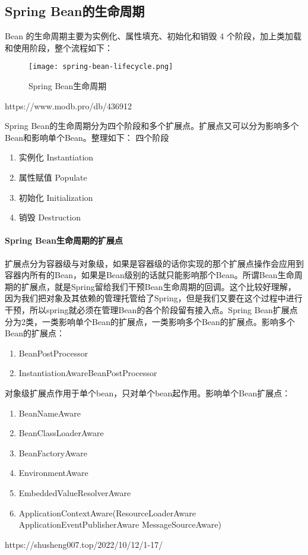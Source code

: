 \documentclass[../../../interview-questions.tex]{subfiles}
\begin{document}
\subsection{Spring Bean的生命周期}


Bean 的生命周期主要为实例化、属性填充、初始化和销毁 4 个阶段，加上类加载和使用阶段，整个流程如下：

\begin{figure}[htbp]
	\centering
	\texttt{[image: spring-bean-lifecycle.png]}
	\caption{Spring Bean生命周期}
	\label{fig:spring-bean-lifecycle}
\end{figure}

https://www.modb.pro/db/436912

Spring Bean的生命周期分为四个阶段和多个扩展点。扩展点又可以分为影响多个Bean和影响单个Bean。整理如下：
四个阶段

\begin{enumerate}
    \item {实例化 Instantiation}
    \item {属性赋值 Populate}
    \item {初始化 Initialization}
    \item {销毁 Destruction}
\end{enumerate}

\paragraph{Spring Bean生命周期的扩展点}

扩展点分为容器级与对象级，如果是容器级的话你实现的那个扩展点操作会应用到容器内所有的Bean，如果是Bean级别的话就只能影响那个Bean。所谓Bean生命周期的扩展点，就是Spring留给我们干预Bean生命周期的回调。这个比较好理解，因为我们把对象及其依赖的管理托管给了Spring，但是我们又要在这个过程中进行干预，所以spring就必须在管理Bean的各个阶段留有接入点。Spring Bean扩展点分为2类，一类影响单个Bean的扩展点，一类影响多个Bean的扩展点。影响多个Bean的扩展点：

\begin{enumerate}
    \item{BeanPostProcessor}
    \item {InstantiationAwareBeanPostProcessor}
\end{enumerate}

对象级扩展点作用于单个bean，只对单个bean起作用。影响单个Bean扩展点：

\begin{enumerate}
    \item {BeanNameAware}
    \item {BeanClassLoaderAware}
    \item {BeanFactoryAware}
    \item {EnvironmentAware}
    \item {EmbeddedValueResolverAware}
    \item {ApplicationContextAware(ResourceLoaderAware ApplicationEventPublisherAware MessageSourceAware)}
\end{enumerate}

https://shusheng007.top/2022/10/12/1-17/
\end{document}
